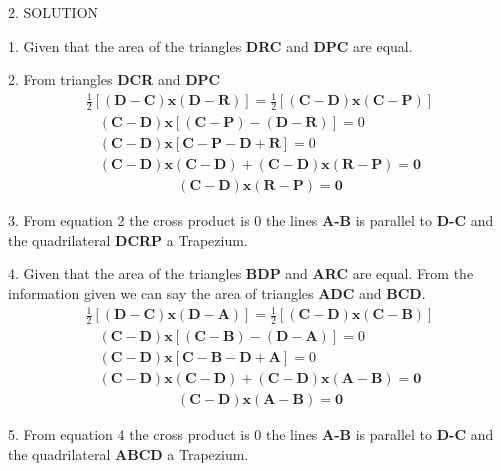 \documentclass[a4paper,10pt]{report}
\let\vec\mathbf
\begin{document}
\begin{multicols}{2}
\centering \large\textsc{2.  S}\footnotesize\textsc{OLUTION}\vspace{5mm}\\ \raggedright\large 1. Given that the area of the triangles \textbf{DRC} and \textbf{DPC} are equal.\\
\raggedright \large 2. From triangles \textbf{DCR} and \textbf{DPC}
\begin{gather}
 \frac{1}{2} \vec{[(D-C)x(D-R)]} =  \frac{1}{2} \vec{[(C-D)x(C-P)
 ]}
\end{gather}
\begin{align*}
 \vec{(C-D) x [(C-P)-(D-R)]} = 0\\
 \vec{(C-D) x [C-P-D+R]} = 0 \\
 \vec{(C-D) x (C-D) + (C-D) x (R-P) = 0}
\end{align*} 
\begin{align}
\vec{(C-D) x (R-P) = 0}
\end{align}
\raggedright 3. From equation 2 the cross product is 0 the lines \textbf{A-B} is parallel to \textbf{D-C} and the quadrilateral \textbf{DCRP} a Trapezium.\\
\raggedright 4. Given that the area of the triangles \textbf{BDP} and \textbf{ARC} are equal. From the information given we can say the area of triangles \textbf{ADC} and \textbf{BCD}. 
\begin{gather}
\frac{1}{2} \vec{[(D-C)x(D-A)]} =  \frac{1}{2} \vec{[(C-D)x(C-B)]}
\end{gather}
\begin{align*}
 \vec{(C-D) x [(C-B)-(D-A)]} = 0\\
 \vec{(C-D) x [C-B-D+A]} = 0 \\
 \vec{(C-D) x (C-D) + (C-D) x (A-B) = 0}
\end{align*}
\begin{align}
\vec{(C-D) x (A-B) = 0}
\end{align}
\raggedright 5. From equation 4 the cross product is 0 the lines \textbf{A-B} is parallel to \textbf{D-C} and the quadrilateral \textbf{ABCD} a Trapezium.\\
\vspace{2mm}
\vspace{2mm}\\

\end{multicols}
\end{document}
